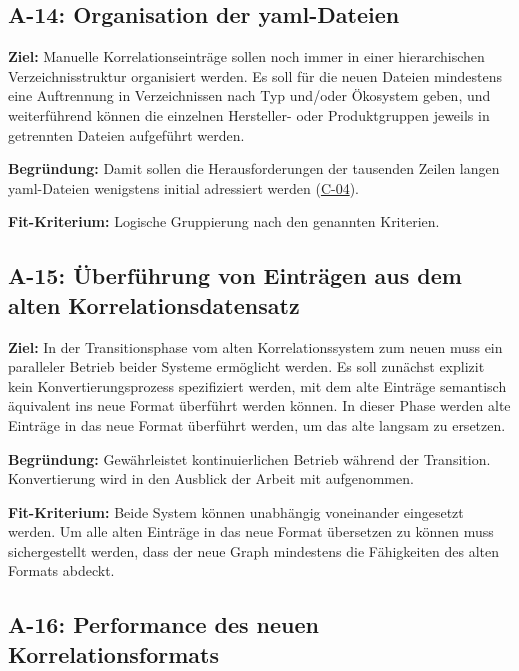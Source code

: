 \subsection{A-14: Organisation der \acrshort{yaml}-Dateien}\label{subsec:req-yaml-file-organization}

\textbf{Ziel:}
Manuelle Korrelationseinträge sollen noch immer in einer hierarchischen Verzeichnisstruktur organisiert werden.
Es soll für die neuen Dateien mindestens eine Auftrennung in Verzeichnissen nach Typ und/oder Ökosystem geben, und weiterführend können die einzelnen Hersteller- oder Produktgruppen jeweils in getrennten Dateien aufgeführt werden.

\textbf{Begründung:}
Damit sollen die Herausforderungen der tausenden Zeilen langen \acrshort{yaml}-Dateien wenigstens initial adressiert werden (\hyperref[subsec:c-04-groe-und-unubersichtliche-yaml-dateien]{C-04}).

\textbf{Fit-Kriterium:}
Logische Gruppierung nach den genannten Kriterien.

\subsection{A-15: Überführung von Einträgen aus dem alten Korrelationsdatensatz}\label{subsec:req-current-dataset-conversion}

\textbf{Ziel:}
In der Transitionsphase vom alten Korrelationssystem zum neuen muss ein paralleler Betrieb beider Systeme ermöglicht werden.
Es soll zunächst explizit kein Konvertierungsprozess spezifiziert werden, mit dem alte Einträge semantisch äquivalent ins neue Format überführt werden können.
In dieser Phase werden alte Einträge in das neue Format überführt werden, um das alte langsam zu ersetzen.

\textbf{Begründung:}
Gewährleistet kontinuierlichen Betrieb während der Transition.
Konvertierung wird in den Ausblick der Arbeit mit aufgenommen.

\textbf{Fit-Kriterium:}
Beide System können unabhängig voneinander eingesetzt werden.
Um alle alten Einträge in das neue Format übersetzen zu können muss sichergestellt werden, dass der neue Graph mindestens die Fähigkeiten des alten Formats abdeckt.

\subsection{A-16: Performance des neuen Korrelationsformats}\label{subsec:req-correlation-format-performance}

